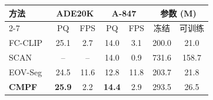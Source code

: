\begin{table}[!htbp]\centering
    \vspace{0.5em}\centering\wuhao
        \begin{tabular}{lcccccc}
            \toprule
            \multirow{2}{*}{方法} & \multicolumn{2}{c}{ADE20K} & \multicolumn{2}{c}{A-847} & \multicolumn{2}{c}{参数 (M)} \\
            \cline{2-7}
             & PQ & FPS & PQ & FPS & 冻结 & 可训练 \\
            \midrule
            FC-CLIP~\cite{yu2023convolutions} & 25.1 & 2.7 & 14.0 & 3.1 & 200.0 & 21.0 \\
            SCAN~\cite{liu2024open} & -- & -- & 14.0 & 0.9 & 731.6 & 158.7 \\
            EOV-Seg~\cite{niu2025eov} & 24.5 & 11.6 & 12.8 & 11.8 & 203.7 & 21.8 \\
            \textbf{CMPF} & \textbf{25.9} & 2.2 & \textbf{14.4} & 2.9 & 293.5 & 26.5 \\
            \bottomrule
        \end{tabular}
\end{table}

